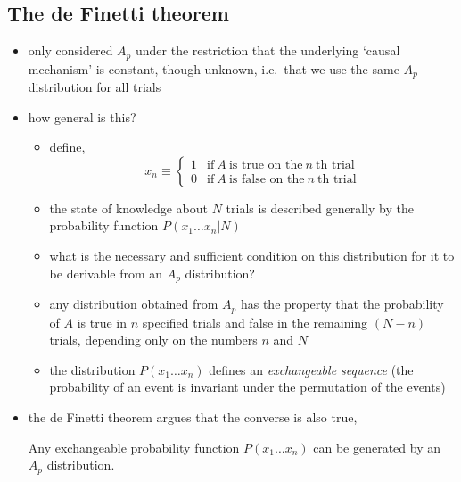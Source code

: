 \documentclass[../jaynes_prob_theory_notes.tex]{subfiles}
\begin{document}
        \subsection{The de Finetti theorem}
            \begin{itemize} 
                \item only considered \(A_p\) under the restriction that the underlying `causal mechanism' is constant, though unknown, i.e.\ that we use the same \(A_p\) distribution for all trials
                \item how general is this?
                    \begin{itemize} 
                        \item define,
                            \begin{equation*} 
                                x_n \equiv \left \{ \begin{matrix} 1 & \text{if}~A~\text{is true on the}~n~\text{th trial} \\ 0 & \text{if}~A~\text{is false on the}~n~\text{th trial}  \end{matrix} \right.
                            \end{equation*}
                        \item the state of knowledge about \(N\) trials is described generally by the probability function \(P(x_1 \ldots x_n | N)\)
                        \item what is the necessary and sufficient condition on this distribution for it to be derivable from an \(A_p\) distribution?
                        \item any distribution obtained from \(A_p\) has the property that the probability of \(A\) is true in \(n\) specified trials and false in the remaining \((N-n)\) trials, depending only on the numbers \(n\) and \(N\)
                        \item the distribution \(P(x_1 \ldots x_n)\) defines an \textit{exchangeable sequence} (the probability of an event is invariant under the permutation of the events)
                    \end{itemize}
                \item the de Finetti theorem argues that the converse is also true,
                    \begin{theorem}
                        Any exchangeable probability function \(P(x_1 \ldots x_n)\) can be generated by an \(A_p\) distribution.
                    \end{theorem}

\end{itemize}
\end{document}
